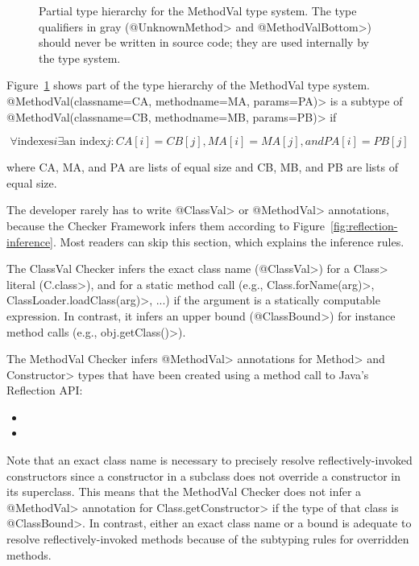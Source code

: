 \begin{figure}
\caption{Partial type hierarchy for the MethodVal type system. The type qualifiers in gray (\<@UnknownMethod>
and \<@MethodValBottom>) should never be written in source code; they are used internally by the type system.}
\label{fig-methodval-hierarchy}
\end{figure}

Figure~\ref{fig-methodval-hierarchy} shows part of the type hierarchy of  the
MethodVal type system.  \<@MethodVal(classname=CA, methodname=MA, params=PA)> is a subtype of
\<@MethodVal(classname=CB, methodname=MB, params=PB)> if

\[\forall \textrm{indexes} i \exists \textrm{an index} j:  CA[i] = CB[j], MA[i] = MA[j], and PA[i] = PB[j]\]

\noindent
where CA, MA, and PA are lists of equal size and CB, MB, and PB are lists of equal size.




The developer rarely has to write \<@ClassVal> or \<@MethodVal>
annotations, because the Checker Framework infers them according to
Figure~\ref{fig:reflection-inference}.  Most readers can skip this
section, which explains the inference rules.



The ClassVal Checker infers the exact class name (\<@ClassVal>) for a
\<Class> literal (\<C.class>), and for a static method call (e.g.,
\<Class.forName(arg)>, \<ClassLoader.loadClass(arg)>, ...) if the argument is a
statically computable expression.  In contrast, it infers an upper bound
(\<@ClassBound>) for instance method calls (e.g., \<obj.getClass()>).

The MethodVal Checker infers \<@MethodVal> annotations for \<Method> and
\<Constructor> types that have been created using a method call to Java's Reflection
API\@:
\begin{itemize}
    \item {}
    \item {}
\end{itemize}

Note that an exact class name is necessary to precisely resolve
reflectively-invoked constructors since a constructor in a subclass does not
override a constructor in its superclass. This means that the MethodVal Checker
does not infer a \<@MethodVal> annotation for \<Class.getConstructor> if the
type of that class is \<@ClassBound>. In contrast, either an exact class name or a bound
is adequate to resolve reflectively-invoked methods because of the subtyping
rules for overridden methods.


